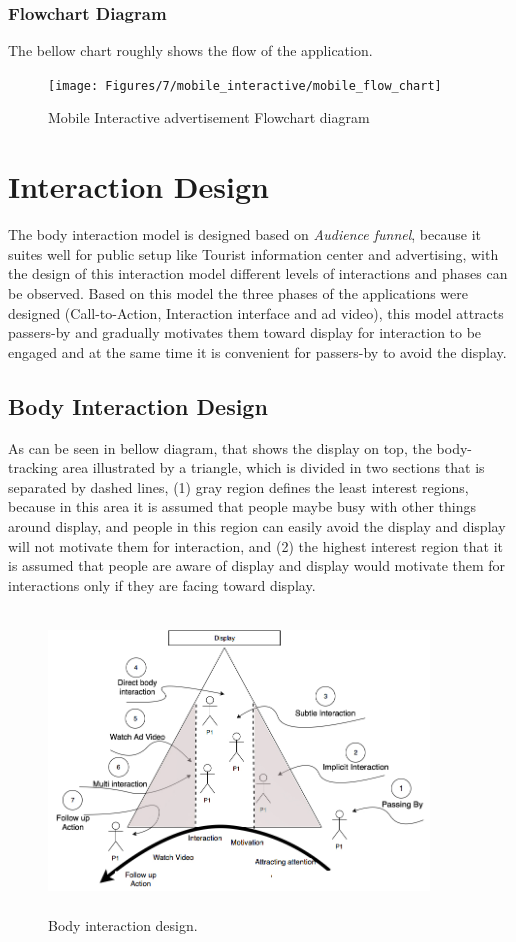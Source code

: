 \subsubsection{Flowchart Diagram}
The bellow chart roughly shows the flow of the application.
\begin{figure}[H]
    \centering
    \texttt{[image: Figures/7/mobile\_interactive/mobile\_flow\_chart]}
    \caption{Mobile Interactive advertisement Flowchart diagram}%
    \label{fig:mobile_flowchat}%
\end{figure}
\fi

\section{Interaction Design}
The body interaction model is designed based on \emph{Audience funnel},  because it suites well for public setup like Tourist information center and advertising, with the design of this interaction model different levels of interactions and phases can be observed. Based on this model the three phases of the applications were designed (Call-to-Action, Interaction interface and ad video), this model attracts passers-by and gradually motivates them toward display for interaction to be engaged and at the same time it is convenient for passers-by to avoid the display. 



\subsection{Body Interaction Design}
As can be seen in bellow diagram, that shows the display on top, the body-tracking area illustrated by a triangle, which is divided in two sections that is separated by dashed lines, (1) gray region defines the least interest regions, because in this area it is assumed that people maybe busy with other things around display, and people in this region can easily avoid the display and display will not motivate them for interaction, and (2) the highest interest region that it is assumed that people are aware of display and display would motivate them for interactions only if they are facing toward display.

\begin{figure}[H]
    \centering
    \includegraphics[width=0.9\textwidth,height=8cm]{Figures/7/body_interaction_model}
    \caption{Body interaction design.}%
    \label{fig:body_interaction_deisng}%
\end{figure}


